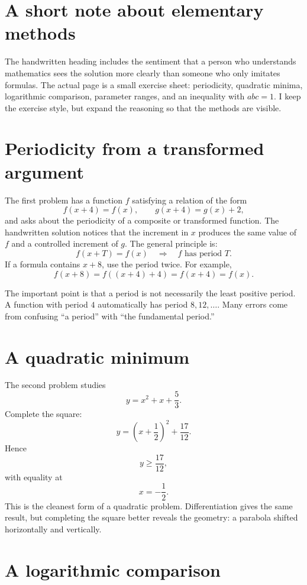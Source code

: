 
\section{A short note about elementary methods}

The handwritten heading includes the sentiment that a person who understands mathematics sees the solution more clearly than someone who only imitates formulas.  The actual page is a small exercise sheet: periodicity, quadratic minima, logarithmic comparison, parameter ranges, and an inequality with \(abc=1\).  I keep the exercise style, but expand the reasoning so that the methods are visible.

\section{Periodicity from a transformed argument}

The first problem has a function \(f\) satisfying a relation of the form
\[
  f(x+4)=f(x),\qquad g(x+4)=g(x)+2,
\]
and asks about the periodicity of a composite or transformed function.  The handwritten solution notices that the increment in \(x\) produces the same value of \(f\) and a controlled increment of \(g\).  The general principle is:
\[
  f(x+T)=f(x)\quad\Longrightarrow\quad f\text{ has period }T.
\]
If a formula contains \(x+8\), use the period twice.  For example,
\[
  f(x+8)=f((x+4)+4)=f(x+4)=f(x).
\]

The important point is that a period is not necessarily the least positive period.  A function with period \(4\) automatically has period \(8,12,\ldots\).  Many errors come from confusing ``a period'' with ``the fundamental period.''

\section{A quadratic minimum}

The second problem studies
\[
  y=x^2+x+\frac53.
\]
Complete the square:
\[
  y=\left(x+\frac12\right)^2+\frac{17}{12}.
\]
Hence
\[
  y\ge\frac{17}{12},
\]
with equality at
\[
  x=-\frac12.
\]
This is the cleanest form of a quadratic problem.  Differentiation gives the same result, but completing the square better reveals the geometry: a parabola shifted horizontally and vertically.

\section{A logarithmic comparison}

